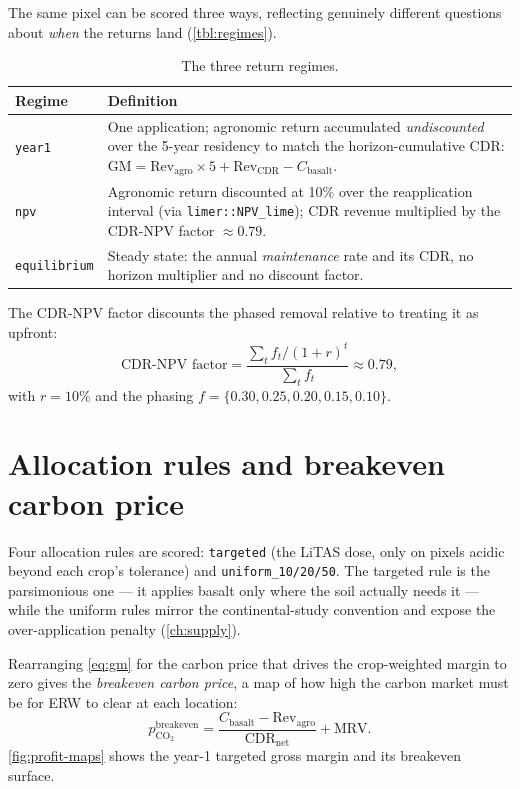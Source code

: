 \documentclass[openany]{book}
\newcommand{\co}{\ensuremath{\mathrm{CO_2}}}
\begin{document}
The same pixel can be scored three ways, reflecting genuinely different questions
about \emph{when} the returns land (\autoref{tbl:regimes}).

\begin{longtable}[]{@{}lp{9.2cm}@{}}
\caption{The three return regimes.}\label{tbl:regimes}\\
\toprule
Regime & Definition \\
\midrule
\endhead
\texttt{year1} & One application; agronomic return accumulated
\emph{undiscounted} over the 5-year residency to match the horizon-cumulative
CDR: $\mathrm{GM} = \mathrm{Rev_{agro}}\times 5 + \mathrm{Rev_{CDR}} -
C_{\text{basalt}}$. \\
\texttt{npv} & Agronomic return discounted at 10\% over the reapplication
interval (via \texttt{limer::NPV\_lime}); CDR revenue multiplied by the CDR-NPV
factor $\approx 0.79$. \\
\texttt{equilibrium} & Steady state: the annual \emph{maintenance} rate and its
CDR, no horizon multiplier and no discount factor. \\
\bottomrule
\end{longtable}

The CDR-NPV factor discounts the phased removal relative to treating it as
upfront:
%
\begin{equation}
\text{CDR-NPV factor} = \frac{\sum_{t} f_t/(1+r)^{t}}{\sum_{t} f_t}
\approx 0.79,
\label{eq:npvfactor}
\end{equation}
%
with $r = 10\%$ and the phasing $f=\{0.30,0.25,0.20,0.15,0.10\}$.

\section{Allocation rules and breakeven carbon price}

Four allocation rules are scored: \texttt{targeted} (the LiTAS dose, only on
pixels acidic beyond each crop's tolerance) and \texttt{uniform\_10/20/50}. The
targeted rule is the parsimonious one --- it applies basalt only where the soil
actually needs it --- while the uniform rules mirror the continental-study
convention and expose the over-application penalty (\autoref{ch:supply}).

Rearranging \autoref{eq:gm} for the carbon price that drives the crop-weighted
margin to zero gives the \emph{breakeven carbon price}, a map of how high the
carbon market must be for ERW to clear at each location:
%
\begin{equation}
p_{\co}^{\text{breakeven}} =
\frac{C_{\text{basalt}} - \mathrm{Rev_{agro}}}{\mathrm{CDR_{net}}} + \mathrm{MRV}.
\label{eq:breakeven}
\end{equation}
%
\autoref{fig:profit-maps} shows the year-1 targeted gross margin and its
breakeven surface.
\end{document}
